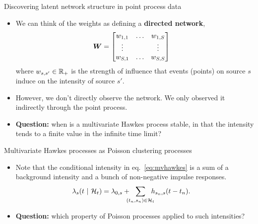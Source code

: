 \documentclass[aspectratio=169]{beamer}
\begin{document}
\begin{frame}{Discovering latent network structure in point process data}
\begin{itemize}
    \itemsep1em
    
    \item We can think of the weights as defining a \textbf{directed network},
    \begin{align}
        \boldsymbol{W} &= 
        \begin{bmatrix}
        w_{1,1} & \ldots & w_{1,S} \\
        \vdots  &        & \vdots \\
        w_{S,1} & \ldots & w_{S,S}
        \end{bmatrix}
    \end{align}
    where $w_{s,s'} \in \mathbb{R}_+$ is the strength of influence that events (points) on source $s$ induce on the intensity of source $s'$.
    
    \item However, we don't directly observe the network. We only observed it indirectly through the point process.
    
    \item \textbf{Question:} when is a multivariate Hawkes process stable, in that the intensity tends to a finite value in the infinite time limit?
\end{itemize}
\end{frame}

\begin{frame}[t]{Multivariate Hawkes processes as Poisson clustering processes}
    \begin{itemize}
        \itemsep1em
        
        \item Note that the conditional intensity in eq.~\eqref{eq:mvhawkes} is a sum of a background intensity and a bunch of non-negative impulse responses.
        \begin{align}
            \lambda_s(t \mid \cH_t) &= \lambda_{0,s} + \!\!\!\!\sum_{(t_n, s_n) \in \cH_t}\!\!\!\! h_{s_n, s}(t - t_n).
        \end{align}
        
        \item \textbf{Question:} which property of Poisson processes applied to such intensities?
    \end{itemize}
\end{frame}
\end{document}
